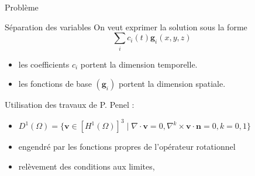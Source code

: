 \documentclass{beamer}
\renewcommand{\div}{{\nabla\cdot}}
\begin{document}
\begin{frame}{Problème}
\begin{block}{Séparation des variables}
On veut exprimer la solution sous la forme
\[ \sum_i c_i(t) \mathbf{g}_i(x,y,z) \]
\begin{itemize}
\item les coefficients $c_i$ portent la dimension temporelle.
\item les fonctions de base $(\mathbf{g}_i)$ portent la dimension spatiale.
\end{itemize}
\end{block}
Utilisation des travaux de P. Penel :
\begin{itemize}
\item $D^1(\Omega) = \{\mathbf{v} \in [H^1(\Omega)]^3\; |\; \div\mathbf{v}=0,\nabla^k\times \mathbf{v}\cdot \mathbf{n} = 0, k=0,1 \}$
\item engendré par les fonctions propres de l'opérateur rotationnel
\item relèvement des conditions aux limites,
\end{itemize}
\end{frame}
\end{document}
